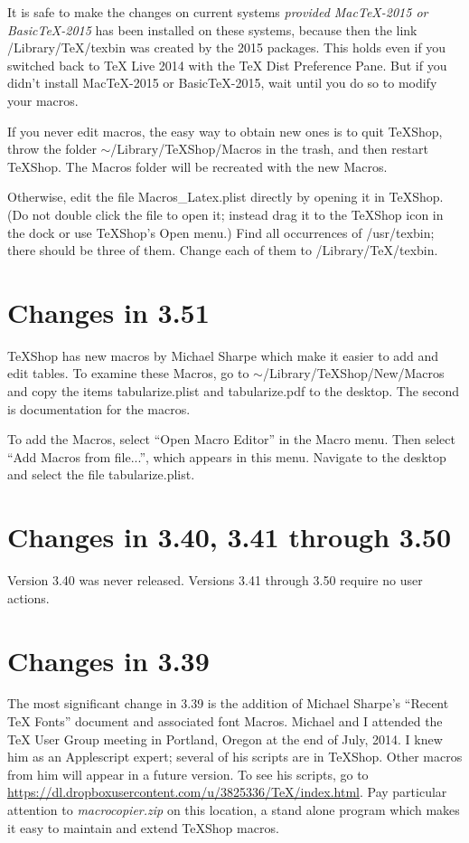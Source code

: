 \documentclass[11pt, oneside]{amsart}
\begin{document}
It is safe to make the changes on current systems {\em provided MacTeX-2015 or BasicTeX-2015}
has been installed on these systems, because then the link /Library/TeX/texbin was created by
the 2015 packages. This holds even if you  switched back to TeX Live 2014 with the
TeX Dist Preference Pane. But if you didn't install MacTeX-2015 or BasicTeX-2015, wait until you do so to modify your macros.

If you never edit macros, the easy way to obtain new ones is to quit TeXShop, throw the folder
$\sim$/Library/TeXShop/Macros in the trash, and then restart TeXShop. The Macros folder will be recreated with the new Macros.

Otherwise, edit the file Macros\_Latex.plist directly by opening it in TeXShop. (Do not double
click the file to open it; instead drag it to the TeXShop icon in the dock or use TeXShop's Open menu.)  Find all occurrences of /usr/texbin; there should be three of them.
Change each of them to /Library/TeX/texbin.





\section{Changes in 3.51}

TeXShop has new macros by Michael Sharpe which make it easier to add and edit tables. To
examine these Macros, go to $\sim$/Library/TeXShop/New/Macros and copy the items tabularize.plist and tabularize.pdf to the desktop. The second is documentation for the macros.

To add the Macros, select ``Open Macro Editor'' in the Macro menu. Then select ``Add Macros
from file...'', which appears in this menu. Navigate to the desktop and select the file
tabularize.plist.


\section{Changes in 3.40, 3.41 through 3.50}

Version 3.40 was never released. Versions 3.41 through 3.50 require no user actions.

\section{Changes in 3.39}

The most significant change in 3.39 is the addition of Michael Sharpe's ``Recent TeX Fonts'' document and associated font Macros.  Michael and I attended the TeX User Group meeting in Portland, Oregon at the end of July, 2014. I knew him as an Applescript expert; several of his scripts are in TeXShop. Other macros from him will appear in a future version. To see his scripts, go to 
\url{https://dl.dropboxusercontent.com/u/3825336/TeX/index.html}. Pay particular attention to 
{\em macrocopier.zip} on this location, a stand alone program which makes it easy to maintain and extend TeXShop macros.
\end{document}
